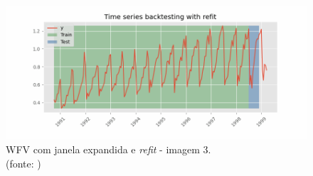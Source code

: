 \begin{figure}[!h]
	\centering
	\includegraphics[scale=0.3]{Figuras/imagem3_skforecast-backtesting-refit.png}
	\caption{WFV com janela expandida e \textit{refit} - imagem 3.\\(fonte: \cite{skforecast_a})}
	\label{fig:imagem3_skforecast-backtesting-refit}
\end{figure}


%
%
%

